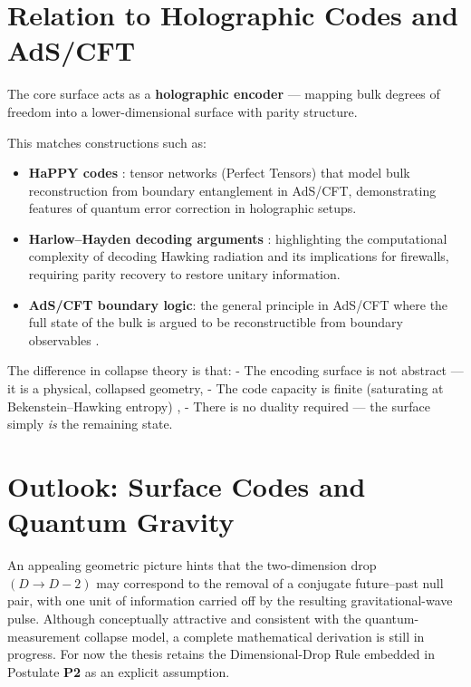 \documentclass[a4paper, 12pt, oneside]{book}
\numberwithin{equation}{chapter}
\begin{document}
\section[Holographic Codes and AdS/CFT]{Relation to Holographic Codes and AdS/CFT}
\label{sec:Holography}

The core surface acts as a \textbf{holographic encoder} —  
mapping bulk degrees of freedom into a lower-dimensional surface with parity structure.

This matches constructions such as:

\begin{itemize}
  \item \textbf{HaPPY codes} \cite{Almheiri2015BulkLocalityEntanglement}: tensor networks (Perfect Tensors) that model bulk reconstruction from boundary entanglement in AdS/CFT, demonstrating features of quantum error correction in holographic setups.
  \item \textbf{Harlow–Hayden decoding arguments} \cite{HarlowHayden2013}: highlighting the computational complexity of decoding Hawking radiation and its implications for firewalls, requiring parity recovery to restore unitary information. %
  \item \textbf{AdS/CFT boundary logic}: the general principle in AdS/CFT where the full state of the bulk is argued to be reconstructible from boundary observables \cite{Susskind1995, tHooft1993}. %
\end{itemize}

The difference in collapse theory is that:
- The encoding surface is not abstract — it is a physical, collapsed geometry,
- The code capacity is finite (saturating at Bekenstein–Hawking entropy) \cite{Hawking1975,Bekenstein1973},
- There is no duality required — the surface simply \emph{is} the remaining state.

\section[Outlook: Surface Codes and Quantum Gravity]{Outlook: Surface Codes and Quantum Gravity}
\label{sec:Outlook}

An appealing geometric picture hints that the two-dimension drop
\((D\!\to\!D-2)\) may correspond to the removal of a conjugate
future–past null pair, with one unit of information carried off by the
resulting gravitational-wave pulse.  Although conceptually attractive
and consistent with the quantum-measurement collapse model, a complete
mathematical derivation is still in progress.  For now the thesis
retains the Dimensional-Drop Rule embedded in Postulate \textbf{P2} as
an explicit assumption.
\end{document}
